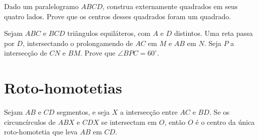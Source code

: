 \documentclass[10pt, a4paper]{article}
\begin{document}
	\begin{prob}
		Dado um paralelogramo $ABCD$, construa externamente quadrados em seus quatro lados. Prove que os centros desses quadrados foram um quadrado.
	\end{prob}

	\begin{prob}
		Sejam $ABC$ e $BCD$ triângulos equiláteros, com $A$ e $D$ distintos. Uma reta passa por $D$, intersectando o prolongamendo de $AC$ em $M$ e $AB$ em $N$. Seja $P$ a intersecção de $CN$ e $BM$. Prove que $\angle BPC = 60^\circ$.
	\end{prob}


	\section{Roto-homotetias}

	\begin{prob}
		Sejam $AB$ e $CD$ segmentos, e seja $X$ a intersecção entre $AC$ e $BD$. Se os circuncírculos de $ABX$ e $CDX$ se intersectam em $O$, então $O$ é o centro da única roto-homotetia que leva $AB$ em $CD$.
	\end{prob}

	


	
	{}
\end{document}
